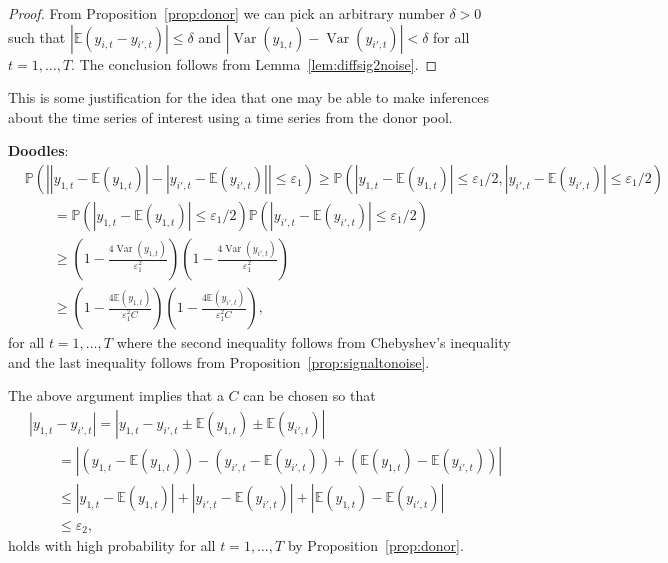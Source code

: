 \documentclass[11pt]{article}
\newcommand{\Prob}{\mathbb{P}}
\def\E{\mathbb{E}} %
\DeclareMathOperator{\Var}{Var} %
\theoremstyle{definition}
\begin{document}
\begin{proof}
  From Proposition~\ref{prop:donor} we can pick an arbitrary number $\delta > 0$ such that $\left\vert\E(y_{i,t} - y_{i',t})\right\vert \leq \delta$ and $|\Var(y_{1,t}) - \Var(y_{i',t})| < \delta$ for all $t = 1,\ldots,T$. The conclusion follows from Lemma~\ref{lem:diffsig2noise}.
\end{proof}

This is some justification for the idea that one may be able to make inferences about the time series of interest using a time series from the donor pool. 

\vspace*{0.5cm}

\noindent \textbf{Doodles}:
\begin{align*}
  &\Prob\left(\left\vert |y_{1,t} - \E(y_{1,t})| - |y_{i',t} - \E(y_{i',t})| \right\vert \leq \varepsilon_1\right) 
  \geq \Prob\left(|y_{1,t} - \E(y_{1,t})| \leq \varepsilon_1/2,  |y_{i',t} - \E(y_{i',t})| \leq \varepsilon_1/2\right) \\
  &\qquad = \Prob\left(|y_{1,t} - \E(y_{1,t})| \leq \varepsilon_1/2\right) \Prob\left(|y_{i',t} - \E(y_{i',t})| \leq \varepsilon_1/2\right) \\
  &\qquad \geq \left(1 - \frac{4\Var(y_{1,t})}{\varepsilon_1^2}\right)\left(1 - \frac{4\Var(y_{i',t})}{\varepsilon_1^2}\right) \\
  &\qquad \geq \left(1 - \frac{4\E(y_{1,t})}{\varepsilon_1^2C}\right)\left(1 - \frac{4\E(y_{i',t})}{\varepsilon_1^2C}\right),
\end{align*}
for all $t = 1,\ldots,T$ where the second inequality follows from Chebyshev's inequality and the last inequality follows from Proposition~\ref{prop:signaltonoise}.

\vspace*{0.5cm}
The above argument implies that a $C$ can be chosen so that 
\begin{align*}
  &|y_{1,t} - y_{i',t}| = |y_{1,t} - y_{i',t} \pm \E(y_{1,t}) \pm \E(y_{i',t})| \\
  &\qquad = |(y_{1,t} - \E(y_{1,t})) - (y_{i',t} - \E(y_{i',t})) + (\E(y_{1,t}) - \E(y_{i',t}))| \\
  &\qquad \leq |y_{1,t} - \E(y_{1,t})| + |y_{i',t} - \E(y_{i',t})| + |\E(y_{1,t}) - \E(y_{i',t})| \\
  &\qquad \leq \varepsilon_2,
\end{align*}
holds with high probability for all $t = 1,\ldots,T$ by Proposition~\ref{prop:donor}.
\end{document}
